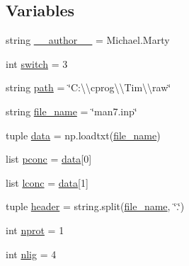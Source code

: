 \subsection*{Variables}
\begin{DoxyCompactItemize}
\item 
string \hyperlink{namespace_uni_dec_1_1unidec__modules_1_1_uni_fit_ab4f0e5ab0733163c7ee6b3570f72df30}{\+\_\+\+\_\+author\+\_\+\+\_\+} = \textquotesingle{}Michael.\+Marty\textquotesingle{}
\item 
int \hyperlink{namespace_uni_dec_1_1unidec__modules_1_1_uni_fit_a9c7cbcf85c64797ae885ac605f163762}{switch} = 3
\item 
string \hyperlink{namespace_uni_dec_1_1unidec__modules_1_1_uni_fit_a10fa2934eaf46e94fe06c0a27ffa4e23}{path} = \char`\"{}C\+:\textbackslash{}\textbackslash{}cprog\textbackslash{}\textbackslash{}\+Tim\textbackslash{}\textbackslash{}raw\char`\"{}
\item 
string \hyperlink{namespace_uni_dec_1_1unidec__modules_1_1_uni_fit_a7e6e2722bb57ed1e194f95225618e654}{file\+\_\+name} = \char`\"{}man7.\+inp\char`\"{}
\item 
tuple \hyperlink{namespace_uni_dec_1_1unidec__modules_1_1_uni_fit_abe318bc901f95348802963e243c953c1}{data} = np.\+loadtxt(\hyperlink{namespace_uni_dec_1_1unidec__modules_1_1_uni_fit_a7e6e2722bb57ed1e194f95225618e654}{file\+\_\+name})
\item 
list \hyperlink{namespace_uni_dec_1_1unidec__modules_1_1_uni_fit_aa019b40015da9a7ea7f34a51f432d066}{pconc} = \hyperlink{namespace_uni_dec_1_1unidec__modules_1_1_uni_fit_abe318bc901f95348802963e243c953c1}{data}\mbox{[}0\mbox{]}
\item 
list \hyperlink{namespace_uni_dec_1_1unidec__modules_1_1_uni_fit_a86d9ea39b15b86dde182abb7c19e97a6}{lconc} = \hyperlink{namespace_uni_dec_1_1unidec__modules_1_1_uni_fit_abe318bc901f95348802963e243c953c1}{data}\mbox{[}1\mbox{]}
\item 
tuple \hyperlink{namespace_uni_dec_1_1unidec__modules_1_1_uni_fit_a860b66bfa0196156348351a1d21ea83f}{header} = string.\+split(\hyperlink{namespace_uni_dec_1_1unidec__modules_1_1_uni_fit_a7e6e2722bb57ed1e194f95225618e654}{file\+\_\+name}, \char`\"{}.\char`\"{})
\item 
int \hyperlink{namespace_uni_dec_1_1unidec__modules_1_1_uni_fit_a645c33a1e667b067d7b6604cff3729ab}{nprot} = 1
\item 
int \hyperlink{namespace_uni_dec_1_1unidec__modules_1_1_uni_fit_a29814f9763c39d2c13010fc0c555d92f}{nlig} = 4
\item 

\end{DoxyCompactItemize}

